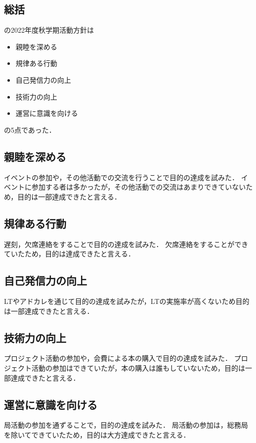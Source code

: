 \subsection*{\firstGrade{}総括}


\firstGrade{}の2022年度秋学期活動方針は
\begin{itemize}
    \item 親睦を深める
    \item 規律ある行動
    \item 自己発信力の向上
    \item 技術力の向上
    \item 運営に意識を向ける
\end{itemize}
の5点であった．

\subsection*{親睦を深める}
イベントの参加や，その他活動での交流を行うことで目的の達成を試みた．
イベントに参加する者は多かったが，その他活動での交流はあまりできていないため，目的は一部達成できたと言える．

\subsection*{規律ある行動}
遅刻，欠席連絡をすることで目的の達成を試みた．
欠席連絡をすることができていたため，目的は達成できたと言える．

\subsection*{自己発信力の向上}
LTやアドカレを通じて目的の達成を試みたが，LTの実施率が高くないため目的は一部達成できたと言える．

\subsection*{技術力の向上}
プロジェクト活動の参加や，会費による本の購入で目的の達成を試みた．
プロジェクト活動の参加はできていたが，本の購入は誰もしていないため，目的は一部達成できたと言える．

\subsection*{運営に意識を向ける}
局活動の参加を通ずることで，目的の達成を試みた．
局活動の参加は，総務局を除いてできていたため，目的は大方達成できたと言える．

